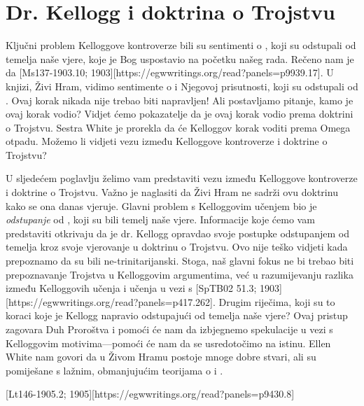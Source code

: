 \chapter{Dr. Kellogg i doktrina o Trojstvu}

Ključni problem Kelloggove kontroverze bili su sentimenti o , koji su odstupali od temelja naše vjere, koje je Bog uspostavio na početku našeg rada. Rečeno nam je da [Ms137-1903.10; 1903][https://egwwritings.org/read?panels=p9939.17]. U knjizi, Živi Hram, vidimo sentimente o  i Njegovoj prisutnosti, koji su odstupali od . Ovaj korak nikada nije trebao biti napravljen! Ali postavljamo pitanje, kamo je ovaj korak vodio? Vidjet ćemo pokazatelje da je ovaj korak vodio prema doktrini o Trojstvu. Sestra White je prorekla da će Kelloggov korak voditi prema Omega otpadu. Možemo li vidjeti vezu između Kelloggove kontroverze i doktrine o Trojstvu?

U sljedećem poglavlju želimo vam predstaviti vezu između Kelloggove kontroverze i doktrine o Trojstvu. Važno je naglasiti da Živi Hram ne sadrži ovu doktrinu kako se ona danas vjeruje. Glavni problem s Kelloggovim učenjem bio je \textit{odstupanje} od , koji su bili temelj naše vjere. Informacije koje ćemo vam predstaviti otkrivaju da je dr. Kellogg opravdao svoje postupke odstupanjem od temelja kroz svoje vjerovanje u doktrinu o Trojstvu. Ovo nije teško vidjeti kada prepoznamo da su  bili ne-trinitarijanski. Stoga, naš glavni fokus ne bi trebao biti prepoznavanje Trojstva u Kelloggovim argumentima, već u razumijevanju razlika između Kelloggovih učenja i učenja  u vezi s [SpTB02 51.3; 1903][https://egwwritings.org/read?panels=p417.262]. Drugim riječima, koji su to koraci koje je Kellogg napravio odstupajući od temelja naše vjere? Ovaj pristup zagovara Duh Proroštva i pomoći će nam da izbjegnemo spekulacije u vezi s Kelloggovim motivima—pomoći će nam da se usredotočimo na istinu. Ellen White nam govori da u Živom Hramu postoje mnoge dobre stvari, ali su pomiješane s lažnim, obmanjujućim teorijama o  i .

[Lt146-1905.2; 1905][https://egwwritings.org/read?panels=p9430.8]

